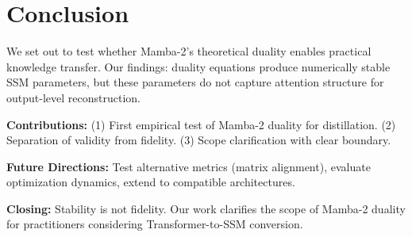 \section{Conclusion}
\label{sec:conclusion}

We set out to test whether Mamba-2's theoretical duality enables practical knowledge transfer. Our findings: duality equations produce numerically stable SSM parameters, but these parameters do not capture attention structure for output-level reconstruction.

\textbf{Contributions:} (1) First empirical test of Mamba-2 duality for distillation. (2) Separation of validity from fidelity. (3) Scope clarification with clear boundary.

\textbf{Future Directions:} Test alternative metrics (matrix alignment), evaluate optimization dynamics, extend to compatible architectures.

\textbf{Closing:} Stability is not fidelity. Our work clarifies the scope of Mamba-2 duality for practitioners considering Transformer-to-SSM conversion.
